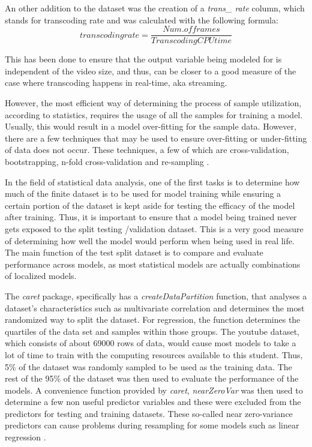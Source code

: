 \documentclass[letterpaper,12pt,titlepage,oneside,final]{report}
\begin{document}
            An other addition to the dataset was the creation of a \textit{trans\_ rate} column, which stands for transcoding rate and was calculated with the following formula:
            $$transcoding rate =  \frac{Num. of frames}{Transcoding CPU time}$$

            This has been done to ensure that the output variable being modeled for is independent of the video size, and thus, can be closer to a good measure of the case where transcoding happens in real-time, aka streaming. 

            However, the most efficient way of determining the process of sample utilization, according to statistics, requires the usage of all the samples for training a model. Usually, this would result in a model over-fitting for the sample data. However, there are a few techniques that may be used to ensure over-fitting or under-fitting of data does not occur. These techniques, a few of which are cross-validation, bootstrapping, n-fold cross-validation and re-sampling \cite{Kuhn2008}.

            In the field of statistical data analysis, one of the first tasks is to determine how much of the finite dataset is to be used for model training while ensuring a certain portion of the dataset is kept aside for testing the efficacy of the model after training. Thus, it is important to ensure that a model being trained never gets exposed to the split testing /validation dataset. This is a very good measure of determining how well the model would perform when being used in real life. The main function of the test split dataset is to compare and evaluate performance across models, as most statistical models are actually combinations of localized models.

            The \textit{caret} package, specifically has a \textit{createDataPartition} function, that analyses a dataset's characteristics such as multivariate correlation and determines the most randomized way to split the dataset. For regression, the function determines the quartiles of the data set and samples within those groups. The youtube dataset, which consists of about 69000 rows of data, would cause most models to take a lot of time to train with the computing resources available to this student. Thus, 5\% of the dataset was randomly sampled to be used as the training data. The rest of the 95\% of the dataset was then used to evaluate the performance of the models. A convenience function provided by \textit{caret}, \textit{nearZeroVar} was then used to determine a few non useful predictor variables and these were excluded from the predictors for testing and training datasets. These so-called near zero-variance predictors can cause problems during resampling for some models such as linear regression \cite{Kuhn2008}.
\end{document}
